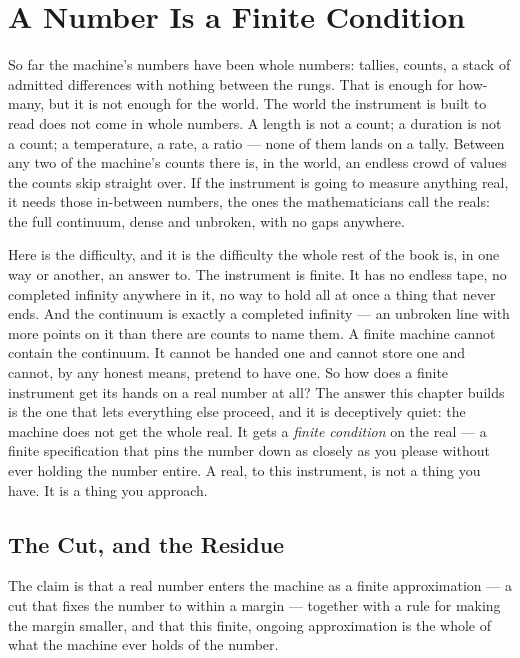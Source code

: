 \chapter{A Number Is a Finite Condition}

So far the machine's numbers have been whole numbers: tallies, counts, a stack of admitted differences with
nothing between the rungs. That is enough for how-many, but it is not enough for the world. The world the
instrument is built to read does not come in whole numbers. A length is not a count; a duration is not a count; a
temperature, a rate, a ratio --- none of them lands on a tally. Between any two of the machine's counts there is,
in the world, an endless crowd of values the counts skip straight over. If the instrument is going to measure
anything real, it needs those in-between numbers, the ones the mathematicians call the reals: the full continuum,
dense and unbroken, with no gaps anywhere.

Here is the difficulty, and it is the difficulty the whole rest of the book is, in one way or another, an answer
to. The instrument is finite. It has no endless tape, no completed infinity anywhere in it, no way to hold all at
once a thing that never ends. And the continuum is exactly a completed infinity --- an unbroken line with more
points on it than there are counts to name them. A finite machine cannot contain the continuum. It cannot be
handed one and cannot store one and cannot, by any honest means, pretend to have one. So how does a finite
instrument get its hands on a real number at all? The answer this chapter builds is the one that lets everything
else proceed, and it is deceptively quiet: the machine does not get the whole real. It gets a \emph{finite
condition} on the real --- a finite specification that pins the number down as closely as you please without ever
holding the number entire. A real, to this instrument, is not a thing you have. It is a thing you approach.

\section{The Cut, and the Residue}

The claim is that a real number enters the machine as a finite approximation --- a cut that fixes the number to
within a margin --- together with a rule for making the margin smaller, and that this finite, ongoing
approximation is the whole of what the machine ever holds of the number.

